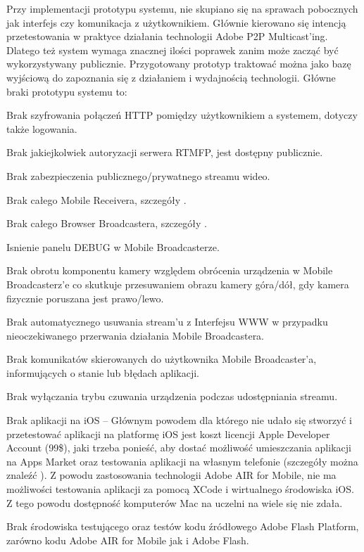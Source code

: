 Przy implementacji prototypu systemu, nie skupiano się na sprawach pobocznych jak interfejs czy komunikacja z użytkownikiem. Głównie kierowano się intencją przetestowania w praktyce działania technologii Adobe P2P Multicast'ing. Dlatego też system wymaga znacznej ilości poprawek zanim może zacząć być wykorzystywany publicznie. Przygotowany prototyp traktować można jako bazę wyjściową do zapoznania się z działaniem i wydajnością technologii. Główne braki prototypu systemu to:

\begin{packed_item}
    \item{Brak szyfrowania połączeń HTTP pomiędzy użytkownikiem a systemem, dotyczy także logowania.}
    \item{Brak jakiejkolwiek autoryzacji serwera RTMFP, jest dostępny publicznie.}
    \item{Brak zabezpieczenia publicznego/prywatnego streamu wideo.}
    \item{Brak całego Mobile Receivera, szczegóły .}
    \item{Brak całego Browser Broadcastera, szczegóły .}
    \item{Isnienie panelu DEBUG w Mobile Broadcasterze.}
    \item{Brak obrotu komponentu kamery względem obrócenia urządzenia w Mobile Broadcasterz'e co skutkuje przesuwaniem obrazu kamery góra/dół, gdy kamera fizycznie poruszana jest prawo/lewo.}
    \item{Brak automatycznego usuwania stream'u z Interfejsu WWW w przypadku nieoczekiwanego przerwania działania Mobile Broadcastera.}
    \item{Brak komunikatów skierowanych do użytkownika Mobile Broadcaster'a, informujących o stanie lub błędach aplikacji.}
    \item{Brak wyłączania trybu czuwania urządzenia podczas udostępniania streamu.}
    \item{Brak aplikacji na iOS -- Głównym powodem dla którego nie udało się stworzyć i przetestować aplikacji na platformę iOS jest koszt licencji Apple Developer Account (99\$), jaki trzeba ponieść, aby dostać możliwość umieszczania aplikacji na Apps Market oraz testowania aplikacji na własnym telefonie (szczegóły można znaleźć \cite{UnknAuth11}). Z powodu zastosowania technologii Adobe AIR for Mobile, nie ma możliwości testowania aplikacji za pomocą XCode i wirtualnego środowiska iOS. Z tego powodu dostępność komputerów Mac na uczelni na wiele się nie zdała.}
    \item{Brak środowiska testującego oraz testów kodu źródłowego Adobe Flash Platform, zarówno kodu Adobe AIR for Mobile jak i Adobe Flash.}
\end{packed_item}

